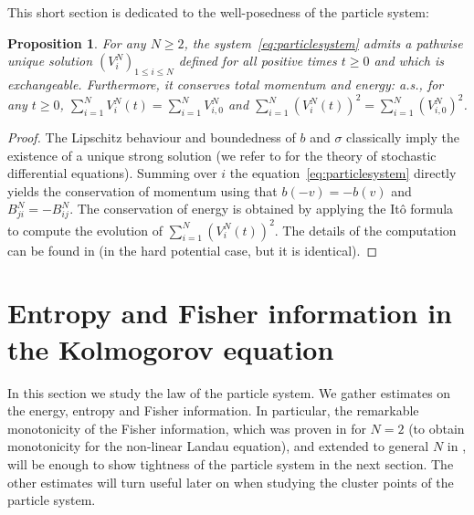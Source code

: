 \documentclass[11pt,a4paper]{article}
\theoremstyle{definition}
\theoremstyle{plain}
\newtheorem{prop}[defi]{Proposition}
\begin{document}
This short section is dedicated to the well-posedness of the particle system:
\begin{prop}
\label{prop:wellposednessparticlesystem}
    For any $N\geq 2$, the system~\eqref{eq:particlesystem} admits a pathwise unique solution $(V^N_i)_{1\leq i\leq N}$ defined for all positive times $t\geq 0$ and which is exchangeable. Furthermore, it conserves total momentum and energy: a.s., for any $t\geq 0$, $\sum_{i=1}^N V^N_i(t)=\sum_{i=1}^N V^N_{i,0}$ and $\sum_{i=1}^N (V^N_i(t))^2=\sum_{i=1}^N (V^N_{i,0})^2$.
\end{prop}
\begin{proof}
    The Lipschitz behaviour and boundedness of $b$ and $\sigma$ classically imply the existence of a unique strong solution (we refer to \cite{PardouxRascanu2014} for the theory of stochastic differential equations). Summing over $i$ the equation~\eqref{eq:particlesystem} directly yields the conservation of momentum using that $b(-v)=-b(v)$ and $B^N_{ji}=-B^N_{ij}$. The conservation of energy is obtained by applying the Itô formula to compute the evolution of $\sum_{i=1}^N (V^N_i(t))^2$. The details of the computation can be found in \cite[Proof of Proposition 3]{NicolasFournierArnaudGuillin2017} (in the hard potential case, but it is identical).
\end{proof}

\section{Entropy and Fisher information in the Kolmogorov equation}
\label{sec:entropy_and_fisher_in_kolmogorov}

In this section we study the law of the particle system. We gather estimates on the energy, entropy and Fisher information. In particular, the remarkable monotonicity of the Fisher information, which was proven in \cite{GuillenSilvestre2023} for $N=2$ (to obtain monotonicity for the non-linear Landau equation), and extended to general $N$ in \cite{CarrilloGuo2025}, will be enough to show tightness of the particle system in the next section. The other estimates will turn useful later on when studying the cluster points of the particle system.
\end{document}
